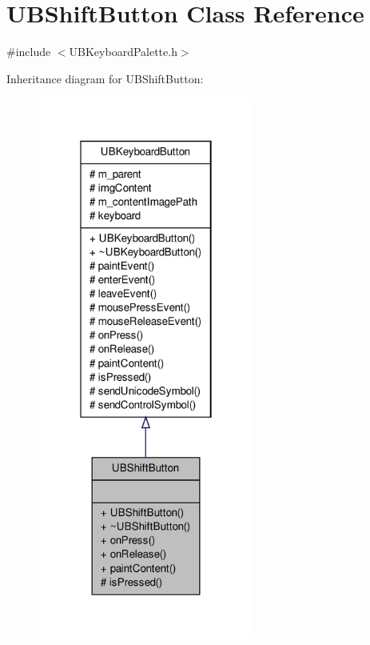 \hypertarget{class_u_b_shift_button}{\section{U\-B\-Shift\-Button Class Reference}
\label{dc/d3d/class_u_b_shift_button}
}


{\ttfamily \#include $<$U\-B\-Keyboard\-Palette.\-h$>$}



Inheritance diagram for U\-B\-Shift\-Button\-:
\nopagebreak
\begin{figure}[H]
\begin{center}
\leavevmode
\includegraphics[width=202pt]{dc/da6/class_u_b_shift_button__inherit__graph}
\end{center}
\end{figure}



